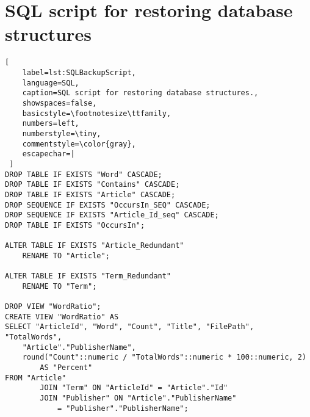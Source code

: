 \chapter{SQL script for restoring database structures}\label{SQLBackupScript}
\begin{lstlisting}[
    label=lst:SQLBackupScript,
    language=SQL,
    caption=SQL script for restoring database structures.,
    showspaces=false,
    basicstyle=\footnotesize\ttfamily,
    numbers=left,
    numberstyle=\tiny,
    commentstyle=\color{gray},
    escapechar=|
 ]
DROP TABLE IF EXISTS "Word" CASCADE;
DROP TABLE IF EXISTS "Contains" CASCADE;
DROP TABLE IF EXISTS "Article" CASCADE;
DROP SEQUENCE IF EXISTS "OccursIn_SEQ" CASCADE;
DROP SEQUENCE IF EXISTS "Article_Id_seq" CASCADE;
DROP TABLE IF EXISTS "OccursIn";

ALTER TABLE IF EXISTS "Article_Redundant"
    RENAME TO "Article";

ALTER TABLE IF EXISTS "Term_Redundant"
    RENAME TO "Term";

DROP VIEW "WordRatio";
CREATE VIEW "WordRatio" AS
SELECT "ArticleId", "Word", "Count", "Title", "FilePath", "TotalWords",
    "Article"."PublisherName",
    round("Count"::numeric / "TotalWords"::numeric * 100::numeric, 2)
        AS "Percent"
FROM "Article"
        JOIN "Term" ON "ArticleId" = "Article"."Id"
        JOIN "Publisher" ON "Article"."PublisherName" 
            = "Publisher"."PublisherName";
\end{lstlisting}